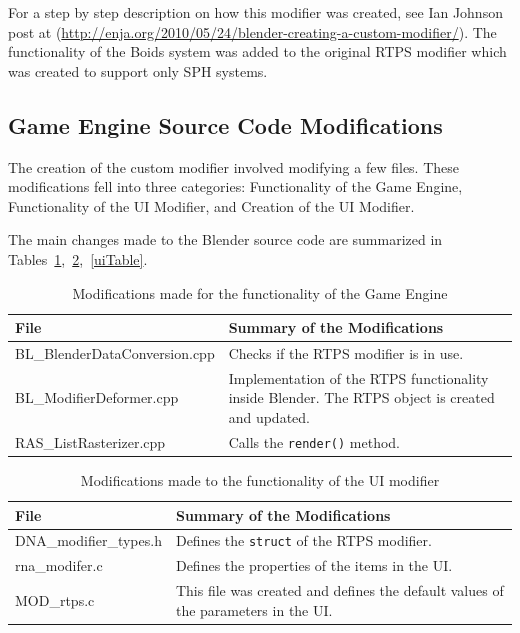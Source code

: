 For a step by step description on how this modifier was created, see Ian Johnson post at (\url{http://enja.org/2010/05/24/blender-creating-a-custom-modifier/}).  The functionality of the Boids system was added to the original RTPS modifier which was created to support only SPH systems. 

\subsection{Game Engine Source Code Modifications}
The creation of the custom modifier involved modifying a few files. These modifications fell into three categories: Functionality of the Game Engine, Functionality of the UI Modifier, and  Creation of the UI Modifier.

The main changes made to the Blender source code are summarized in Tables~\ref{geTable},~\ref{funcTable},~\ref{uiTable}.


\begin{table}[htdp]
\caption{Modifications made for the functionality of the Game Engine}
\begin{center}
\begin{tabular}{|p{6cm}|p{6cm}|}
\hline 
\textbf{File} & \textbf{Summary of the Modifications} \\\hline 
BL\_BlenderDataConversion.cpp & Checks if the RTPS modifier is in use. \\\hline 
BL\_ModifierDeformer.cpp & Implementation of the RTPS functionality inside Blender. The RTPS object is created and updated. \\\hline 
RAS\_ListRasterizer.cpp & Calls the \texttt{render()} method. \\
\hline 
\end{tabular} 
\end{center}
\label{geTable}
\end{table}

\begin{table}[htdp]
\caption{Modifications made to the functionality of the UI modifier}
\begin{center}
\begin{tabular}{|p{6cm}|p{6cm}|}
\hline 
\textbf{File} & \textbf{Summary of the Modifications} \\\hline 
DNA\_modifier\_types.h & Defines the \texttt{struct} of the RTPS modifier. \\\hline 
rna\_modifer.c & Defines the properties of the items in the UI. \\\hline 
MOD\_rtps.c & This file was created and defines the default values of the parameters in the UI. \\
\hline 
\end{tabular}
\end{center}
\label{funcTable}
\end{table}

